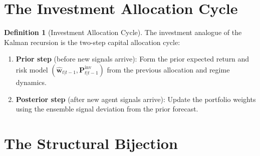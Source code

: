 \documentclass[12pt,openany]{book}
\numberwithin{equation}{chapter}
\theoremstyle{plain}
\theoremstyle{definition}
\newtheorem{definition}[theorem]{Definition}
\theoremstyle{remark}
\begin{document}
\section{The Investment Allocation Cycle}

\begin{definition}[Investment Allocation Cycle]
\label{def:allocation-cycle}
The investment analogue of the Kalman recursion is the two-step
capital allocation cycle:

\begin{enumerate}
  \item \textbf{Prior step} (before new signals arrive):
        Form the prior expected return and risk model
        $(\hat{\mathbf{w}}_{t|t-1}, \mathbf{P}_{t|t-1}^{\mathrm{inv}})$
        from the previous allocation and regime dynamics.
  \item \textbf{Posterior step} (after new agent signals arrive):
        Update the portfolio weights using the ensemble signal
        deviation from the prior forecast.
\end{enumerate}
\end{definition}

\section{The Structural Bijection}
\end{document}
